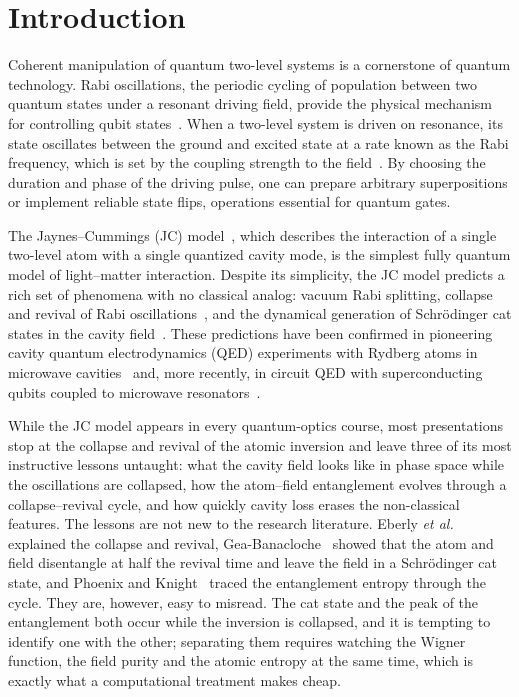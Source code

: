 \documentclass{iopjournal}
\begin{document}
\section{Introduction}
\label{sec:intro}

Coherent manipulation of quantum two-level systems is a cornerstone of quantum technology. Rabi oscillations, the periodic cycling of population between two quantum states under a resonant driving field, provide the physical mechanism for controlling qubit states~\cite{rabi1937, scully1997}. When a two-level system is driven on resonance, its state oscillates between the ground and excited state at a rate known as the Rabi frequency, which is set by the coupling strength to the field~\cite{allen1975, gerry2004}. By choosing the duration and phase of the driving pulse, one can prepare arbitrary superpositions or implement reliable state flips, operations essential for quantum gates.

The Jaynes--Cummings (JC) model~\cite{jaynes1963}, which describes the interaction of a single two-level atom with a single quantized cavity mode, is the simplest fully quantum model of light--matter interaction. Despite its simplicity, the JC model predicts a rich set of phenomena with no classical analog: vacuum Rabi splitting, collapse and revival of Rabi oscillations~\cite{eberly1980}, and the dynamical generation of Schr\"{o}dinger cat states in the cavity field~\cite{brune1996}. These predictions have been confirmed in pioneering cavity quantum electrodynamics (QED) experiments with Rydberg atoms in microwave cavities~\cite{rempe1987, haroche2006} and, more recently, in circuit QED with superconducting qubits coupled to microwave resonators~\cite{blais2021}.

While the JC model appears in every quantum-optics course, most presentations stop at the collapse and revival of the atomic inversion and leave three of its most instructive lessons untaught: what the cavity field looks like in phase space while the oscillations are collapsed, how the atom--field entanglement evolves through a collapse--revival cycle, and how quickly cavity loss erases the non-classical features. The lessons are not new to the research literature. Eberly \textit{et al.}~\cite{eberly1980} explained the collapse and revival, Gea-Banacloche~\cite{gea-banacloche1990, gea-banacloche1991} showed that the atom and field disentangle at half the revival time and leave the field in a Schr\"{o}dinger cat state, and Phoenix and Knight~\cite{phoenix1988, phoenix1991} traced the entanglement entropy through the cycle. They are, however, easy to misread. The cat state and the peak of the entanglement both occur while the inversion is collapsed, and it is tempting to identify one with the other; separating them requires watching the Wigner function, the field purity and the atomic entropy at the same time, which is exactly what a computational treatment makes cheap.
\end{document}
